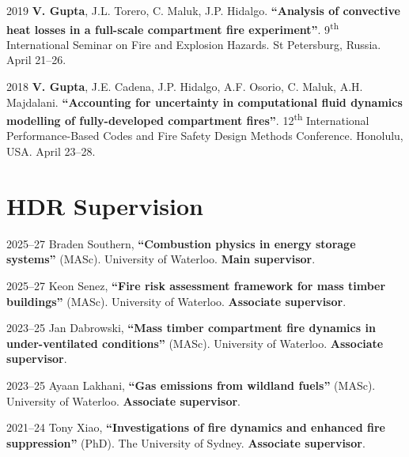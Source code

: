 \documentclass[12pt,letterpaper]{report}
\begin{document}
\begin{tablist}
        \item[2019] \tab *\textbf{V. Gupta}, J.L. Torero, C. Maluk, J.P. Hidalgo. \textbf{\enquote{Analysis of convective heat losses in a full-scale compartment fire experiment}}. 9\textsuperscript{th} International Seminar on Fire and Explosion Hazards. St Petersburg, Russia. April 21--26.
        
        \item[2018] \tab \textbf{V. Gupta}, J.E. Cadena, J.P. Hidalgo, A.F. Osorio, C. Maluk, A.H. Majdalani. \textbf{\enquote{Accounting for uncertainty in computational fluid dynamics modelling of fully-developed compartment fires}}. 12\textsuperscript{th} International Performance-Based Codes and Fire Safety Design Methods Conference. Honolulu, USA. April 23--28.

	 \end{tablist}

    \section*{HDR Supervision}

	\begin{tablist}

		\item[2025--27] \tab Braden Southern, \textbf{\enquote{Combustion physics in energy storage systems}} (MASc). University of Waterloo. \textbf{Main supervisor}.

		\item[2025--27] \tab Keon Senez, \textbf{\enquote{Fire risk assessment framework for mass timber buildings}} (MASc). University of Waterloo. \textbf{Associate supervisor}.

		\item[2023--25] \tab Jan Dabrowski, \textbf{\enquote{Mass timber compartment fire dynamics in under-ventilated conditions}} (MASc). University of Waterloo. \textbf{Associate supervisor}.

		\item[2023--25] \tab Ayaan Lakhani, \textbf{\enquote{Gas emissions from wildland fuels}} (MASc). University of Waterloo. \textbf{Associate supervisor}.

		\item[2021--24] \tab Tony Xiao, \textbf{\enquote{Investigations of fire dynamics and enhanced fire suppression}} (PhD). The University of Sydney. \textbf{Associate supervisor}.
        
	\end{tablist}
\end{document}
